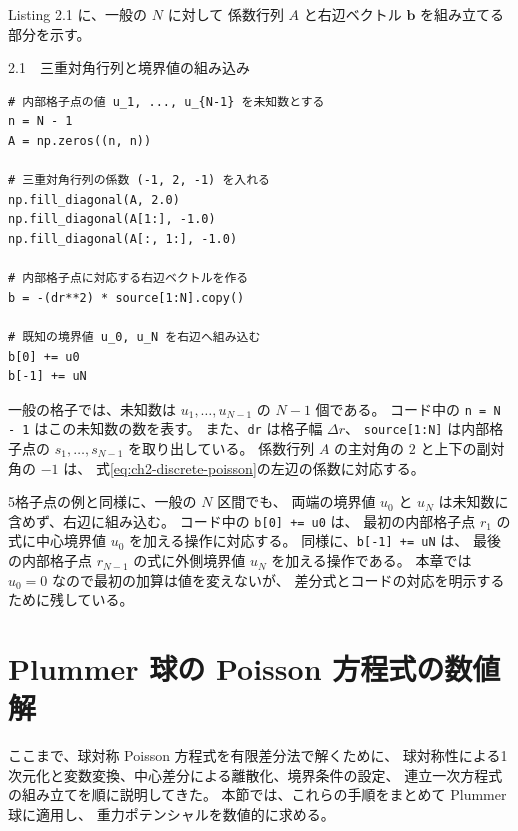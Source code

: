 Listing 2.1 に、一般の $N$ に対して
係数行列 $A$ と右辺ベクトル $\boldsymbol{b}$ を組み立てる部分を示す。

\begin{listingbox}{2.1　三重対角行列と境界値の組み込み}
\begin{Verbatim}[fontsize=\small]
# 内部格子点の値 u_1, ..., u_{N-1} を未知数とする
n = N - 1
A = np.zeros((n, n))

# 三重対角行列の係数 (-1, 2, -1) を入れる
np.fill_diagonal(A, 2.0)
np.fill_diagonal(A[1:], -1.0)
np.fill_diagonal(A[:, 1:], -1.0)

# 内部格子点に対応する右辺ベクトルを作る
b = -(dr**2) * source[1:N].copy()

# 既知の境界値 u_0, u_N を右辺へ組み込む
b[0] += u0
b[-1] += uN
\end{Verbatim}
\end{listingbox}

一般の格子では、未知数は $u_1,\ldots,u_{N-1}$ の $N-1$ 個である。
コード中の \texttt{n = N - 1} はこの未知数の数を表す。
また、\texttt{dr} は格子幅 $\Delta r$、
\texttt{source[1:N]} は内部格子点の
$s_1,\ldots,s_{N-1}$ を取り出している。
係数行列 $A$ の主対角の $2$ と上下の副対角の $-1$ は、
式\eqref{eq:ch2-discrete-poisson}の左辺の係数に対応する。

5格子点の例と同様に、一般の $N$ 区間でも、
両端の境界値 $u_0$ と $u_N$ は未知数に含めず、右辺に組み込む。
コード中の \texttt{b[0] += u0} は、
最初の内部格子点 $r_1$ の式に中心境界値 $u_0$ を加える操作に対応する。
同様に、\texttt{b[-1] += uN} は、
最後の内部格子点 $r_{N-1}$ の式に外側境界値 $u_N$ を加える操作である。
本章では $u_0=0$ なので最初の加算は値を変えないが、
差分式とコードの対応を明示するために残している。



\section{Plummer 球の Poisson 方程式の数値解}
\label{sec:ch2-solve-plummer}

ここまで、球対称 Poisson 方程式を有限差分法で解くために、
球対称性による1次元化と変数変換、中心差分による離散化、境界条件の設定、
連立一次方程式の組み立てを順に説明してきた。
本節では、これらの手順をまとめて Plummer 球に適用し、
重力ポテンシャルを数値的に求める。

